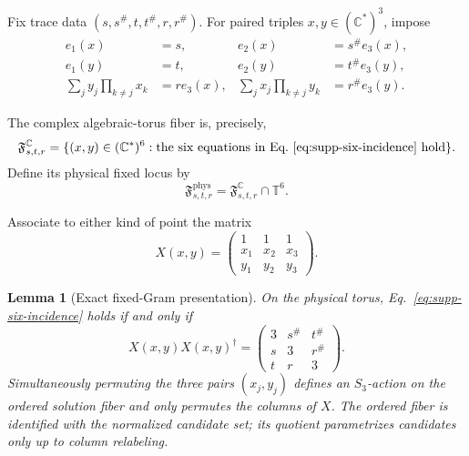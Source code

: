 \documentclass[aps,prx,reprint,nofootinbib,twoside,superscriptaddress,longbibliography,floatfix]{revtex4-2}
\newtheorem{lemma}[theorem]{Lemma}
\theoremstyle{definition}
\newcommand{\T}{\mathbb T}
\newcommand{\C}{\mathbb C}
\begin{document}
Fix trace data $(s,s^\#,t,t^\#,r,r^\#)$.
For paired triples $x,y\in(\C^*)^3$, impose
\begin{equation}
\begin{aligned}
e_1(x)&=s,& e_2(x)&=s^\#e_3(x),\\
e_1(y)&=t,& e_2(y)&=t^\#e_3(y),\\
\sum_jy_j\!\prod_{k\ne j}x_k&=re_3(x),&
\sum_jx_j\!\prod_{k\ne j}y_k&=r^\#e_3(y).
\end{aligned}
\label{eq:supp-six-incidence}
\end{equation}

The complex algebraic-torus fiber is, precisely,
\begin{equation}
\mathfrak F^{\C}_{s,t,r}
=\{(x,y)\in(\C^*)^6:\text{the six equations in
Eq.~\eqref{eq:supp-six-incidence} hold}\}.
\label{eq:supp-complex-fiber}
\end{equation}
Define its physical fixed locus by
\begin{equation}
\mathfrak F^{\mathrm{phys}}_{s,t,r}
=\mathfrak F^{\C}_{s,t,r}\cap\T^6.
\label{eq:supp-physical-fiber}
\end{equation}

Associate to either kind of point the matrix
\begin{equation}
X(x,y)=\begin{pmatrix}1&1&1\\x_1&x_2&x_3\\y_1&y_2&y_3\end{pmatrix}.
\label{eq:supp-X}
\end{equation}


\begin{lemma}[Exact fixed-Gram presentation]
\label{lem:supp-incidence-gram}
On the physical torus, Eq.~\eqref{eq:supp-six-incidence} holds if and only if
\begin{equation}
X(x,y)X(x,y)^\dagger=
\begin{pmatrix}3&s^\#&t^\#\\s&3&r^\#\\t&r&3\end{pmatrix}.
\label{eq:supp-Xgram}
\end{equation}
Simultaneously permuting the three pairs $(x_j,y_j)$ defines an $S_3$-action on the ordered solution fiber and only permutes the columns of $X$. The ordered fiber is identified with the normalized candidate set; its quotient parametrizes candidates only up to column relabeling.
\end{lemma}
\end{document}
